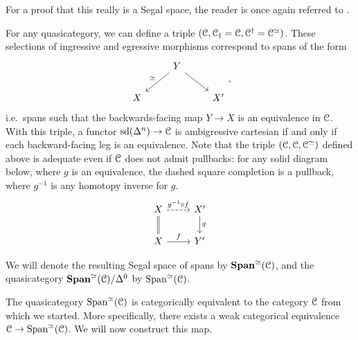 \documentclass[main.tex]{subfiles}
\begin{document}
For a proof that this really is a Segal space, the reader is once again referred to \cite{spectralmackeyfunctors1}.

\begin{example}
  \label{eg:spans_with_equivalences_on_one_leg}
  For any quasicategory, we can define a triple $(\mathcal{C}, \mathcal{C}_{\dagger} = \mathcal{C}, \mathcal{C}^{\dagger} = \mathcal{C}^{\simeq})$. These selections of ingressive and egressive morphisms correspond to spans of the form
  \begin{equation*}
    \begin{tikzcd}
      & Y
      \arrow[dl, swap, "\simeq"]
      \arrow[dr]
      \\
      X
      && X'
    \end{tikzcd},
  \end{equation*}
  i.e.\ spans such that the backwards-facing map $Y \to X$ is an equivalence in $\mathcal{C}$. With this triple, a functor $\mathrm{sd}(\Delta^{n}) \to \mathcal{C}$ is ambigressive cartesian if and only if each backward-facing leg is an equivalence. Note that the triple $(\mathcal{C}, \mathcal{C}, \mathcal{C}^{\simeq})$ defined above is adequate even if $\mathcal{C}$ does not admit pullbacks: for any solid diagram below, where $g$ is an equivalence, the dashed square completion is a pullback, where $g^{-1}$ is any homotopy inverse for $g$.
  \begin{equation*}
    \begin{tikzcd}
      X
      \arrow[r, dashed, "g^{-1} \circ f"]
      \arrow[d, swap, equals]
      & X'
      \arrow[d, "g"]
      \\
      X
      \arrow[r, "f"]
      & Y'
    \end{tikzcd}
  \end{equation*}

  We will denote the resulting Segal space of spans by $\mathbf{Span}^{\simeq}(\mathcal{C})$, and the quasicategory $\mathbf{Span}^{\simeq}(\mathcal{C})/\Delta^{0}$ by $\mathrm{Span}^{\simeq}(\mathcal{C})$. 

  The quasicategory $\mathrm{Span}^{\simeq}(\mathcal{C})$ is categorically equivalent to the category $\mathcal{C}$ from which we started. More specifically, there exists a weak categorical equivalence $\mathcal{C} \to \mathrm{Span}^{\simeq}(\mathcal{C})$. We will now construct this map. 


\end{example}
\end{document}
